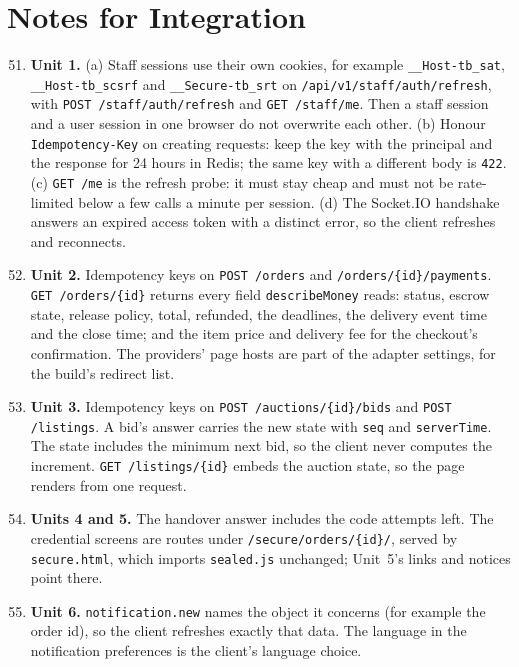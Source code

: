 \documentclass[11pt,a4paper]{article}
\begin{document}
\section{Notes for Integration}
\label{sec:notes}
\begin{enumerate}[label=\textbf{I-\arabic*}, leftmargin=*, nosep]
  \setcounter{enumi}{50}
  \item \textbf{Unit 1.} (a) Staff sessions use their own cookies, for example \texttt{\_\_Host-tb\_sat}, \texttt{\_\_Host-tb\_scsrf} and \texttt{\_\_Secure-tb\_srt} on \texttt{/api/v1/staff/auth/refresh}, with \texttt{POST /staff/auth/refresh} and \texttt{GET /staff/me}. Then a staff session and a user session in one browser do not overwrite each other. (b) Honour \texttt{Idempotency-Key} on creating requests: keep the key with the principal and the response for 24 hours in Redis; the same key with a different body is \texttt{422}. (c) \texttt{GET /me} is the refresh probe: it must stay cheap and must not be rate-limited below a few calls a minute per session. (d) The Socket.IO handshake answers an expired access token with a distinct error, so the client refreshes and reconnects.
  \item \textbf{Unit 2.} Idempotency keys on \texttt{POST /orders} and \texttt{/orders/\{id\}/payments}. \texttt{GET /orders/\{id\}} returns every field \texttt{describeMoney} reads: status, escrow state, release policy, total, refunded, the deadlines, the delivery event time and the close time; and the item price and delivery fee for the checkout's confirmation. The providers' page hosts are part of the adapter settings, for the build's redirect list.
  \item \textbf{Unit 3.} Idempotency keys on \texttt{POST /auctions/\{id\}/bids} and \texttt{POST /listings}. A bid's answer carries the new state with \texttt{seq} and \texttt{serverTime}. The state includes the minimum next bid, so the client never computes the increment. \texttt{GET /listings/\{id\}} embeds the auction state, so the page renders from one request.
  \item \textbf{Units 4 and 5.} The handover answer includes the code attempts left. The credential screens are routes under \texttt{/secure/orders/\{id\}/}, served by \texttt{secure.html}, which imports \texttt{sealed.js} unchanged; Unit~5's links and notices point there.
  \item \textbf{Unit 6.} \texttt{notification.new} names the object it concerns (for example the order id), so the client refreshes exactly that data. The language in the notification preferences is the client's language choice.

\end{enumerate}
\end{document}
